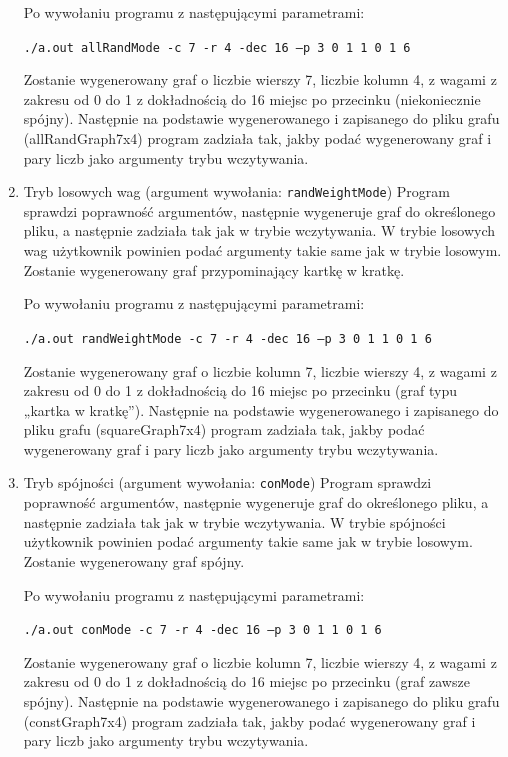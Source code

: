 \documentclass{article}
\begin{document}
\begin{enumerate}
Po wywołaniu programu z następującymi parametrami:

\texttt{./a.out allRandMode -c  7 -r 4 -dec 16 –p 3 0 1 1 0 1 6}

Zostanie wygenerowany graf o liczbie wierszy 7, liczbie kolumn 4, z wagami z zakresu od 0 do 1 z dokładnością do 16 miejsc po przecinku (niekoniecznie spójny). Następnie na podstawie wygenerowanego i zapisanego do pliku grafu (allRandGraph7x4) program zadziała tak, jakby podać wygenerowany graf i pary liczb jako argumenty trybu wczytywania.

\item Tryb losowych wag (argument wywołania: \texttt{randWeightMode})
Program sprawdzi poprawność argumentów, następnie wygeneruje graf do określonego pliku, a następnie zadziała tak jak w trybie wczytywania.
W trybie losowych wag użytkownik powinien podać argumenty takie same jak w trybie losowym. Zostanie wygenerowany graf przypominający kartkę w kratkę.

Po wywołaniu programu z następującymi parametrami:

\texttt{./a.out randWeightMode -c  7 -r 4 -dec 16 –p 3 0 1 1 0 1 6}

Zostanie wygenerowany graf o liczbie kolumn 7, liczbie wierszy 4, z wagami z zakresu od 0 do 1 z dokładnością do 16 miejsc po przecinku (graf typu „kartka w kratkę”). Następnie na podstawie wygenerowanego i zapisanego do pliku grafu (squareGraph7x4) program zadziała tak, jakby podać wygenerowany graf i pary liczb jako argumenty trybu wczytywania.

\item Tryb spójności (argument wywołania: \texttt{conMode})
Program sprawdzi poprawność argumentów, następnie wygeneruje graf do określonego pliku, a następnie zadziała tak jak w trybie wczytywania.
W trybie spójności użytkownik powinien podać argumenty takie same jak w trybie losowym. Zostanie wygenerowany graf spójny.

Po wywołaniu programu z następującymi parametrami:

\texttt{./a.out conMode -c  7 -r 4 -dec 16 –p 3 0 1 1 0 1 6}

Zostanie wygenerowany graf o liczbie kolumn 7, liczbie wierszy 4, z wagami z zakresu od 0 do 1 z dokładnością do 16 miejsc po przecinku (graf zawsze spójny). Następnie na podstawie wygenerowanego i zapisanego do pliku grafu (constGraph7x4) program zadziała tak, jakby podać wygenerowany graf i pary liczb jako argumenty trybu wczytywania.
\end{enumerate}
\end{document}
